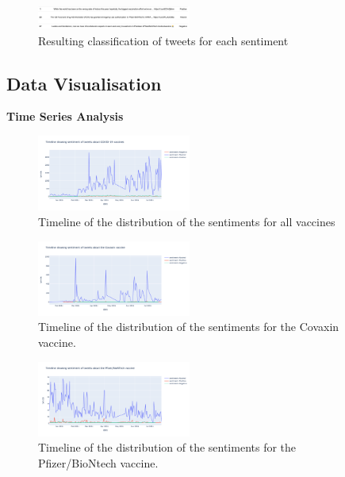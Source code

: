 \documentclass[conference]{IEEEtran}
\begin{document}
\begin{figure}[h]
\centering
\includegraphics[width=0.45\textwidth]{classification.png}
\caption{Resulting classification of tweets for each sentiment}
\label{fig:fig21}
\end{figure} 


\subsection{Data Visualisation}

 \textbf{Time Series Analysis}
 
 \begin{figure}[h]
\centering
\includegraphics[width=0.45\textwidth]{vaccinetimeline.png}
\caption{Timeline of the distribution of the sentiments for all vaccines}
\label{fig:fig10}
\end{figure} 

\begin{figure}[h]
\centering
\includegraphics[width=0.45\textwidth]{covaxin.png}
\caption{Timeline of the distribution of the sentiments for the Covaxin vaccine.}
\label{fig:fig11}
\end{figure} 

\begin{figure}[h]
\centering
\includegraphics[width=0.45\textwidth]{pfizer.png}
\caption{Timeline of the distribution of the sentiments for the Pfizer/BioNtech vaccine.}
\label{fig:fig22}
\end{figure} 
\end{document}
